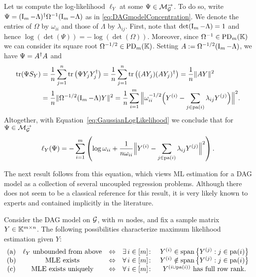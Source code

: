 Let us compute the log-likelihood $\ell_Y$ at some $\Psi \in \mathcal{M}_{\mathcal{G}}^{\to}$. To do so, write $\Psi = (\operatorname{I}_m - \Lambda)^{\dagger} \Omega^{-1} (\operatorname{I}_m - \Lambda)$ as in \eqref{eq:DAGmodelConcentration}. We denote the entries of $\Omega$ by $\omega_{ii}$ and those of $\Lambda$ by $\lambda_{ij}$. First, note that $\det(\operatorname{I}_m - \Lambda) = 1$ and hence $\log(\det(\Psi)) = - \log(\det(\Omega))$. Moreover, since $\Omega^{-1} \in \operatorname{PD}_m(\mathbb K)$ we can consider its square root $\Omega^{-1/2} \in \operatorname{PD}_m(\mathbb K)$. Setting $A:= \Omega^{-1/2} (\operatorname{I}_m - \Lambda)$, we have $\Psi = A^{\dagger} A$ and
\begin{align*}
	\operatorname{tr}(\Psi S_Y) &= \frac{1}{n} \sum_{j=1}^n \operatorname{tr} \big( \Psi Y_j Y_j^{\dagger} \big)
	= \frac{1}{n} \sum_{j=1}^n \operatorname{tr} \big( (A Y_j) (A Y_j)^{\dagger} \big) = \frac{1}{n} \| A Y\|^2 \\
	&= \frac{1}{n} \| \Omega^{-1/2} (\operatorname{I}_m - \Lambda) Y\|^2
	= \frac{1}{n} \sum_{i=1}^m \Big\| \omega_{ii}^{-1/2} \Big( Y^{(i)} - \sum_{j \in \operatorname{pa}(i)} \lambda_{ij} Y^{(j)} \Big)  \Big\|^2.
\end{align*}
Altogether, with Equation~\eqref{eq:GaussianLogLikelihood} we conclude that for $\Psi \in \mathcal{M}_{\mathcal{G}}^{\to}$
\begin{equation}\label{eq:LogLikelihoodDAG}
	\ell_Y(\Psi) = - \sum_{i=1}^m \left( \log \omega_{ii} + \frac{1}{n \omega_{ii}} \Big\| Y^{(i)} - \sum_{j \in \operatorname{pa}(i)} \lambda_{ij} Y^{(j)}  \Big\|^2 \right) .
\end{equation}

The next result follows from this equation, which views ML estimation for a DAG model as a collection of several uncoupled regression problems. Although there does not seem to be a classical reference for this result, it is very likely known to experts and contained implicitly in the literature.

\begin{theorem}\label{thm:LinearIndependenceDAG}
	Consider the DAG model on $\mathcal{G}$, with $m$ nodes, and fix a sample matrix $Y \in \mathbb K^{m \times n}$. The following possibilities characterize maximum likelihood estimation given $Y$:
	\[ \begin{matrix} \text{(a)} & \ell_Y \text{ unbounded from above}  & \Leftrightarrow & \exists \, i \in [m] \colon &  Y^{(i)} \in \operatorname{span} \big\lbrace Y^{(j)} : j \in \operatorname{pa}(i)  \big\rbrace \\ 
		\text{(b)} & \text{MLE exists}  & \Leftrightarrow & \forall \, i \in [m] \colon & Y^{(i)} \notin \operatorname{span} \big\lbrace Y^{(j)} : j \in \operatorname{pa}(i)  \big\rbrace \\ 
		\text{(c)} & \text{MLE exists uniquely} & \Leftrightarrow & \forall \, i \in [m] \colon & Y^{(i \cup \operatorname{pa}(i))} \text{ has full row rank}. \\ \end{matrix} \] 
\end{theorem}

